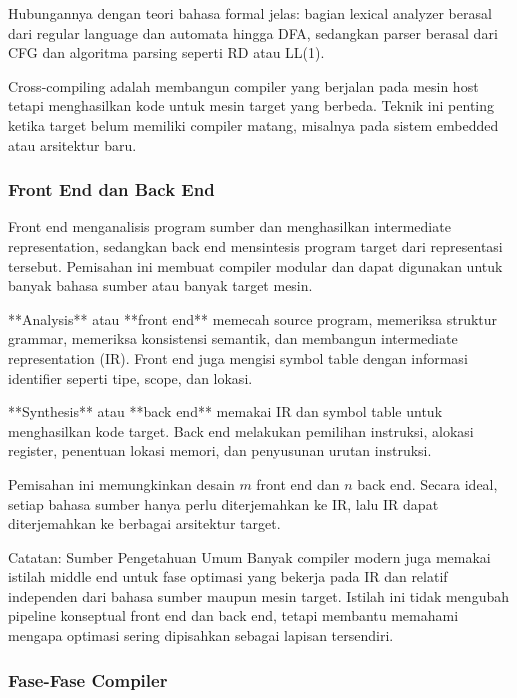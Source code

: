 Hubungannya dengan teori bahasa formal jelas: bagian lexical analyzer berasal dari regular language dan automata hingga DFA, sedangkan parser berasal dari CFG dan algoritma parsing seperti RD atau LL(1).

Cross-compiling adalah membangun compiler yang berjalan pada mesin host tetapi menghasilkan kode untuk mesin target yang berbeda. Teknik ini penting ketika target belum memiliki compiler matang, misalnya pada sistem embedded atau arsitektur baru.

\subsubsection{Front End dan Back End}

\begin{jawab}
Front end menganalisis program sumber dan menghasilkan intermediate representation, sedangkan back end mensintesis program target dari representasi tersebut. Pemisahan ini membuat compiler modular dan dapat digunakan untuk banyak bahasa sumber atau banyak target mesin.
\end{jawab}

**Analysis** atau **front end** memecah source program, memeriksa struktur grammar, memeriksa konsistensi semantik, dan membangun intermediate representation (IR). Front end juga mengisi symbol table dengan informasi identifier seperti tipe, scope, dan lokasi.

**Synthesis** atau **back end** memakai IR dan symbol table untuk menghasilkan kode target. Back end melakukan pemilihan instruksi, alokasi register, penentuan lokasi memori, dan penyusunan urutan instruksi.

Pemisahan ini memungkinkan desain $m$ front end dan $n$ back end. Secara ideal, setiap bahasa sumber hanya perlu diterjemahkan ke IR, lalu IR dapat diterjemahkan ke berbagai arsitektur target.

\begin{cmt}{Catatan: Sumber Pengetahuan Umum}{}
Banyak compiler modern juga memakai istilah middle end untuk fase optimasi yang bekerja pada IR dan relatif independen dari bahasa sumber maupun mesin target. Istilah ini tidak mengubah pipeline konseptual front end dan back end, tetapi membantu memahami mengapa optimasi sering dipisahkan sebagai lapisan tersendiri.
\end{cmt}

\subsubsection{Fase-Fase Compiler}

